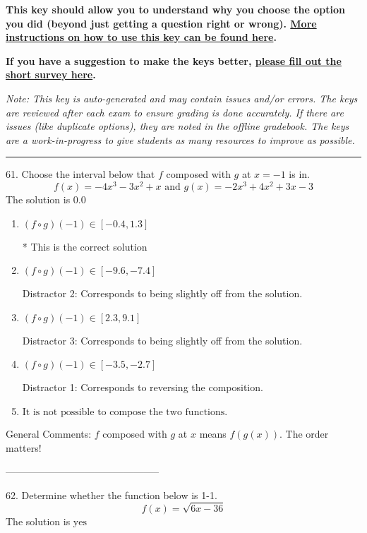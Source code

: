 \documentclass{extbook}[14pt]
\begin{document}
\textbf{This key should allow you to understand why you choose the option you did (beyond just getting a question right or wrong). \href{https://xronos.clas.ufl.edu/mac1105spring2020/courseDescriptionAndMisc/Exams/LearningFromResults}{More instructions on how to use this key can be found here}.}

\textbf{If you have a suggestion to make the keys better, \href{https://forms.gle/CZkbZmPbC9XALEE88}{please fill out the short survey here}.}

\textit{Note: This key is auto-generated and may contain issues and/or errors. The keys are reviewed after each exam to ensure grading is done accurately. If there are issues (like duplicate options), they are noted in the offline gradebook. The keys are a work-in-progress to give students as many resources to improve as possible.}

\rule{\textwidth}{0.4pt}

61. Choose the interval below that $f$ composed with $g$ at $x=-1$ is in.
\[ f(x) = -4x^{3} -3 x^{2} +x \text{ and } g(x) = -2x^{3} +4 x^{2} +3 x -3 \] 
The solution is $ 0.0 $ 

\begin{enumerate}[label=\Alph*.] 
\item $ (f \circ g)(-1) \in [-0.4, 1.3] $ 

 * This is the correct solution 
\item $ (f \circ g)(-1) \in [-9.6, -7.4] $ 

  Distractor 2: Corresponds to being slightly off from the solution. 
\item $ (f \circ g)(-1) \in [2.3, 9.1] $ 

  Distractor 3: Corresponds to being slightly off from the solution. 
\item $ (f \circ g)(-1) \in [-3.5, -2.7] $ 

  Distractor 1: Corresponds to reversing the composition. 
\item $ \text{It is not possible to compose the two functions.} $ 

  
\end{enumerate} 
 
General Comments: $f$ composed with $g$ at $x$ means $f(g(x))$. The order matters!

-----------------------------------------------

62. Determine whether the function below is 1-1.
\[ f(x) = \sqrt{6 x - 36} \] 
The solution is $ \text{yes} $ 
\end{document}
